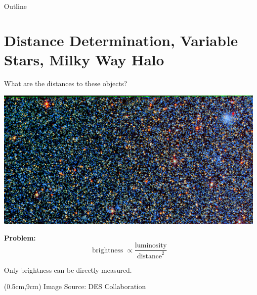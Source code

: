 \documentclass[12pt]{beamer}
\newcommand{\foot}[1]{\begin{textblock*}{12cm}(0.5cm,9cm) %
  {\tiny #1}
      \end{textblock*}}
\begin{document}
\begin{frame}{Outline}
  \tableofcontents
  \end{frame}









\section{Distance Determination, Variable Stars, Milky Way Halo}

\begin{frame}{What are the distances to these objects?}

  \begin{center}
    \includegraphics[scale=0.5]{figs/des_small.png}\\
  \end{center}
  \textbf{Problem:}
  \begin{equation*}
    \text{ brightness } \propto \frac{\text{luminosity}}{\text{distance}^2}
  \end{equation*}
\begin{center}
  Only brightness can be directly measured.
  \end{center}

\foot{Image Source: DES Collaboration}
\end{frame}
\end{document}
